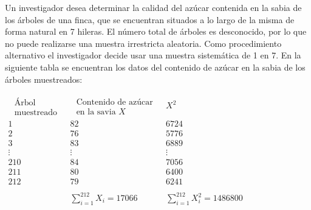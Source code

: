 \addpoints
\question[25] Un investigador desea determinar la calidad del azúcar contenida en la sabia de los árboles
de una finca, que se encuentran situados a lo largo de la misma de forma natural en 7 hileras.
El número total de árboles es desconocido, por lo que no puede realizarse una muestra
irrestricta aleatoria. Como procedimiento alternativo el investigador decide usar una muestra
sistemática de 1 en 7. En la siguiente tabla se encuentran los datos del contenido de azúcar en
la sabia de los árboles muestreados:

\begin{center}
$\begin{array}{ccc}
\begin{array}{c}
\text { Árbol } \\
\text { muestreado }
\end{array} & \begin{array}{c}
\text { Contenido de azúcar } \\
\text { en la savia } X
\end{array} & X^{2} \\
\hline 1 & 82 & 6724 \\
2 & 76 & 5776 \\
3 & 83 & 6889 \\
\vdots & \vdots & \vdots \\
210 & 84 & 7056 \\
211 & 80 & 6400 \\
212 & 79 & 6241 \\ \\
& \sum_{i=1}^{212} X_{i}=17066 & \sum_{i=1}^{212} X_{i}^{2}=1486800
\end{array}$
\end{center}
\noaddpoints
{}
